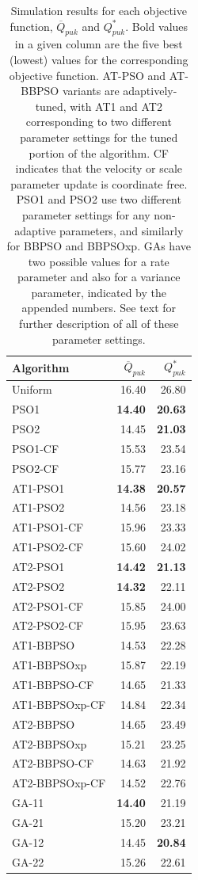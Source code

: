 \documentclass[cmbright]{staauth}
\begin{document}
\begin{table}[p]
\centering
\begingroup\scriptsize
\begin{tabular}{lrr}
Algorithm & $\overline{Q}_{puk}$ & $Q^*_{puk}$ \\\hline
Uniform & 16.40 & 26.80 \\\hline
PSO1 & \bf{14.40} & \bf{20.63} \\
  PSO2 & 14.45 & \bf{21.03}\\
  PSO1-CF & 15.53 & 23.54 \\
  PSO2-CF & 15.77 & 23.16 \\
   \hline
AT1-PSO1 & \bf{14.38} & \bf{20.57} \\
  AT1-PSO2 & 14.56 & 23.18 \\
  AT1-PSO1-CF & 15.96 & 23.33 \\
  AT1-PSO2-CF & 15.60 & 24.02 \\
   \hline
AT2-PSO1 & \bf{14.42} & \bf{21.13} \\
  AT2-PSO2 & \bf{14.32} & 22.11 \\
  AT2-PSO1-CF & 15.85 & 24.00 \\
  AT2-PSO2-CF & 15.95 & 23.63 \\
   \hline
AT1-BBPSO & 14.53 & 22.28 \\
  AT1-BBPSOxp & 15.87 & 22.19 \\
  AT1-BBPSO-CF & 14.65 & 21.33 \\
  AT1-BBPSOxp-CF & 14.84 & 22.34 \\
   \hline
AT2-BBPSO & 14.65 & 23.49 \\
  AT2-BBPSOxp & 15.21 & 23.25 \\
  AT2-BBPSO-CF & 14.63 & 21.92\\
  AT2-BBPSOxp-CF & 14.52 & 22.76 \\
   \hline
GA-11 & \bf{14.40} & 21.19 \\
  GA-21 & 15.20 & 23.21 \\
  GA-12 & 14.45 & \bf{20.84} \\
  GA-22 & 15.26 & 22.61 \\
\hline
\end{tabular}
\endgroup
\caption{ Simulation results for each objective function, $\overline{Q}_{puk}$ and $Q^*_{puk}$. Bold values in a given column are the five best (lowest)  values for the corresponding objective function. AT-PSO and AT-BBPSO variants are adaptively-tuned, with AT1 and AT2 corresponding to two different parameter settings for the tuned portion of the algorithm. CF indicates that the velocity or scale parameter update is coordinate free. PSO1 and PSO2 use two different parameter settings for any non-adaptive parameters, and similarly for BBPSO and BBPSOxp. GAs have two possible values for a rate parameter and also for a variance parameter, indicated by the appended numbers. See text for further description of all of these parameter settings.}
\label{tab:psokriging}
\end{table}
\end{document}
